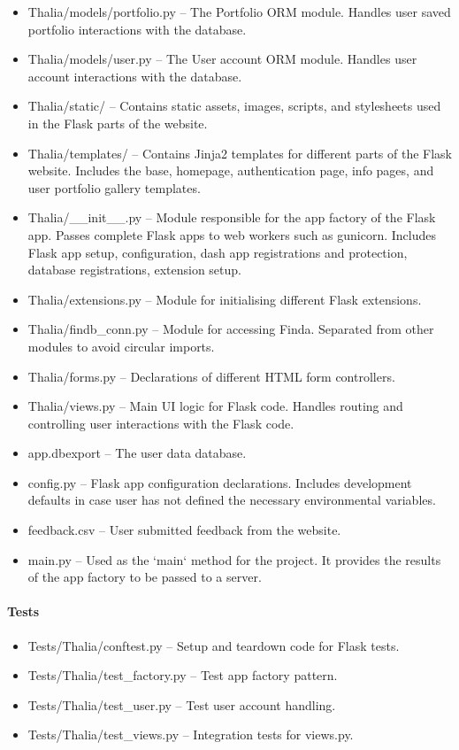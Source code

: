 \documentclass[main.tex]{subfiles}
\begin{document}
\begin{itemize}

\item
  Thalia/models/portfolio.py -- The Portfolio ORM module. Handles user saved portfolio interactions with the database.
\item
  Thalia/models/user.py -- The User account ORM module. Handles user account interactions with the database.
\item
  Thalia/static/ -- Contains static assets, images, scripts, and stylesheets used in the Flask parts of the website.
\item
  Thalia/templates/ -- Contains Jinja2 templates for different parts of the Flask website. Includes the base, homepage, authentication page, info pages, and user portfolio gallery templates.
\item
  Thalia/\_\_init\_\_.py -- Module responsible for the app factory of the Flask app. Passes complete Flask apps to web workers such as gunicorn. Includes Flask app setup, configuration, dash app registrations and protection, database registrations, extension setup.
\item
  Thalia/extensions.py -- Module for initialising different Flask
  extensions.
\item
  Thalia/findb\_conn.py -- Module for accessing Finda. Separated from other modules to avoid circular imports.
\item
  Thalia/forms.py -- Declarations of different HTML form controllers.
\item
  Thalia/views.py -- Main UI logic for Flask code. Handles routing and controlling user interactions with the Flask code.
\item
  app.dbexport -- The user data database.
\item
  config.py -- Flask app configuration declarations. Includes
  development defaults in case user has not defined the necessary
  environmental variables.
\item
  feedback.csv -- User submitted feedback from the website.
\item
  main.py -- Used as the `main` method for the project. It provides the results of the app factory to be passed to a server.
\end{itemize}

\paragraph{Tests}\label{tests-4}

\begin{itemize}

\item
  Tests/Thalia/conftest.py -- Setup and teardown code for Flask tests.
\item
  Tests/Thalia/test\_factory.py -- Test app factory pattern.
\item
  Tests/Thalia/test\_user.py -- Test user account handling.
\item
  Tests/Thalia/test\_views.py -- Integration tests for views.py.
\end{itemize}
\end{document}

